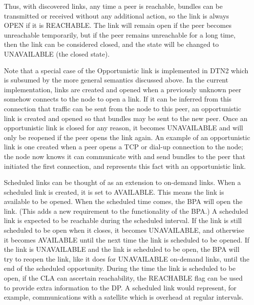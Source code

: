 \documentclass[11pt]{article}
\begin{document}
Thus, with discovered links, any time a peer is
reachable, bundles can be transmitted or received without any additional
action, so the link is always OPEN if it is REACHABLE. The link will remain
open if the peer becomes
unreachable temporarily, but if the peer remains unreachable for a long time,
then the link can be considered closed, and the state will be changed to
UNAVAILABLE (the closed state).

Note that a special case of the Opportunistic link is implemented in DTN2
which is subsumed by the more general semantics discussed above.  In the 
current implementation, links are created and opened when a previously 
unknown peer somehow connects to the node to open a link.  If it can be 
inferred from this connection that traffic can be sent from the node to this 
peer, an opportunistic link is created and opened so that bundles may be sent 
to the new peer. Once an opportunistic link is closed for any reason, it 
becomes UNAVAILABLE and will only be reopened if the peer opens the
link again. An example of an opportunistic link is one created when a peer
opens a TCP or dial-up connection to the node; the node now knows it can
communicate with and send bundles to the peer that initiated the first
connection, and represents this fact with an opportunistic link. 

Scheduled links can be thought of as an extension to on-demand links. When a
scheduled link is created, it is set to AVAILABLE. This means the link is
available to be opened.
When the scheduled time comes, the BPA will open the link. (This adds a 
new requirement to the functionality of the BPA.)
 A
scheduled link is expected to be reachable during the scheduled interval.  If
the link is still scheduled to be open when it closes, it becomes UNAVAILABLE,
and otherwise it becomes AVAILABLE until the next time the link is scheduled to
be opened. If the link is UNAVAILABLE and the link is scheduled to be open,
the BPA will try to reopen the link,
like it does for UNAVAILABLE on-demand links, until the end of the scheduled
opportunity. During the time the link is scheduled to be open, if the CLA can
ascertain reachability, the REACHABLE flag can be used to provide extra
information to the DP. A scheduled link would represent, for example,
communications with a satellite which is overhead at regular intervals.
\end{document}

